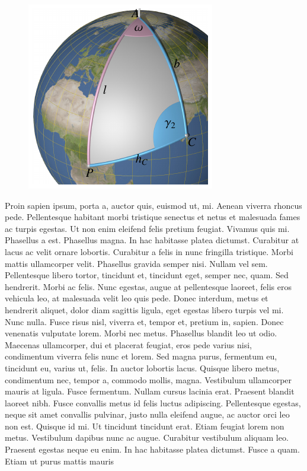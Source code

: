 \documentclass[12pt]{article}
\begin{document}
\begin{figure}
\includegraphics{position5-small.pdf}
\end{figure}
Proin sapien ipsum, porta a, auctor quis, euismod ut, mi. Aenean
viverra rhoncus pede. Pellentesque habitant morbi tristique senectus
et netus et malesuada fames ac turpis egestas. Ut non enim eleifend
felis pretium feugiat. Vivamus quis mi. Phasellus a est. Phasellus
magna. In hac habitasse platea dictumst. Curabitur at lacus ac velit
ornare lobortis. Curabitur a felis in nunc fringilla tristique.
Morbi mattis ullamcorper velit. Phasellus gravida semper nisi.
Nullam vel sem. Pellentesque libero tortor, tincidunt et, tincidunt
eget, semper nec, quam. Sed hendrerit. Morbi ac felis. Nunc egestas,
augue at pellentesque laoreet, felis eros vehicula leo, at malesuada
velit leo quis pede. Donec interdum, metus et hendrerit aliquet,
dolor diam sagittis ligula, eget egestas libero turpis vel mi. Nunc
nulla. Fusce risus nisl, viverra et, tempor et, pretium in, sapien.
Donec venenatis vulputate lorem. Morbi nec metus. Phasellus blandit
leo ut odio. Maecenas ullamcorper, dui et placerat feugiat, eros
pede varius nisi, condimentum viverra felis nunc et lorem. Sed magna
purus, fermentum eu, tincidunt eu, varius ut, felis. In auctor
lobortis lacus. Quisque libero metus, condimentum nec, tempor a,
commodo mollis, magna. Vestibulum ullamcorper mauris at ligula.
Fusce fermentum. Nullam cursus lacinia erat. Praesent blandit laoreet
nibh. Fusce convallis metus id felis luctus adipiscing. Pellentesque
egestas, neque sit amet convallis pulvinar, justo nulla eleifend
augue, ac auctor orci leo non est. Quisque id mi. Ut tincidunt
tincidunt erat. Etiam feugiat lorem non metus. Vestibulum dapibus
nunc ac augue. Curabitur vestibulum aliquam leo. Praesent egestas
neque eu enim. In hac habitasse platea dictumst. Fusce a quam. Etiam
ut purus mattis mauris
\end{document}
